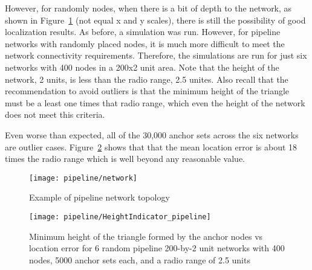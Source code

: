 However, for randomly nodes, when there is a bit of depth to the network, as shown in Figure~\ref{fig:pipeline} (not equal x and y scales), there is still the possibility of good localization results.  As before, a simulation was run.  However, for pipeline networks with randomly placed nodes, it is much more difficult to meet the network connectivity requirements.  Therefore, the simulations are run for just six networks with 400 nodes in a 200x2 unit area.  Note that the height of the network, 2 units, is less than the radio range, 2.5 unites.  Also recall that the recommendation to avoid outliers is that the minimum height of the triangle must be a least one times that radio range, which even the height of the network does not meet this criteria. 

Even worse than expected, all of the 30,000 anchor sets across the six networks are outlier cases.  Figure~\ref{fig:pipelineindicator} shows that that the mean location error is about 18 times the radio range which is well beyond any reasonable value.

\begin{figure}
  \centering
	\texttt{[image: pipeline/network]}
	\caption{Example of pipeline network topology}
	\label{fig:pipeline}
\end{figure}

\begin{figure}
  \centering
	\texttt{[image: pipeline/HeightIndicator\_pipeline]}
	\caption[Minimum height of the triangle formed by the anchor nodes vs location error in a pipeline topology]{Minimum height of the triangle formed by the anchor nodes vs location error for 6 random pipeline 200-by-2 unit networks with 400 nodes, 5000 anchor sets each, and a radio range of 2.5 units}
	\label{fig:pipelineindicator}
\end{figure}

